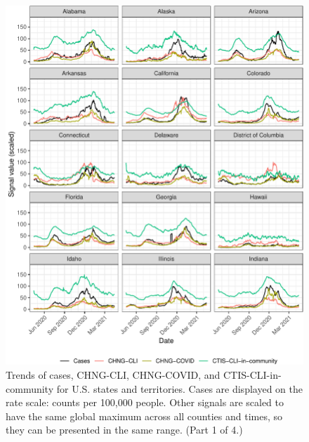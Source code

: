 \documentclass[9pt,twoside,lineno]{pnas-new}
\begin{document}
\clearpage

\begin{figure}

{\centering \includegraphics[width=\textwidth]{fig/state-trend-grids-1-1} 

}

\caption{Trends of cases, CHNG-CLI, CHNG-COVID, and CTIS-CLI-in-community for U.S. states and territories. Cases are displayed on the rate scale: counts per 100,000 people. Other signals are scaled to have the same global maximum across all counties and times, so they can be presented in the same range. (Part 1 of 4.)}\label{fig:state-trend-grids-1}
\end{figure}

\clearpage
\end{document}
